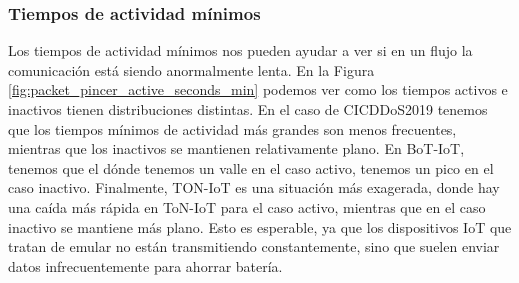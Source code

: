 \subsubsection{Tiempos de actividad mínimos}

Los tiempos de actividad mínimos nos pueden ayudar a ver si en un flujo la comunicación está siendo anormalmente lenta. En la Figura \ref{fig:packet_pincer_active_seconds_min} podemos ver como los tiempos activos e inactivos tienen distribuciones distintas. En el caso de CICDDoS2019 tenemos que los tiempos mínimos de actividad más grandes son menos frecuentes, mientras que los inactivos se mantienen relativamente plano. En BoT-IoT, tenemos que el dónde tenemos un valle en el caso activo, tenemos un pico en el caso inactivo. Finalmente, TON-IoT es una situación más exagerada, donde hay una caída más rápida en ToN-IoT para el caso activo, mientras que en el caso inactivo se mantiene más plano. Esto es esperable, ya que los dispositivos IoT que tratan de emular no están transmitiendo constantemente, sino que suelen enviar datos infrecuentemente para ahorrar batería.


